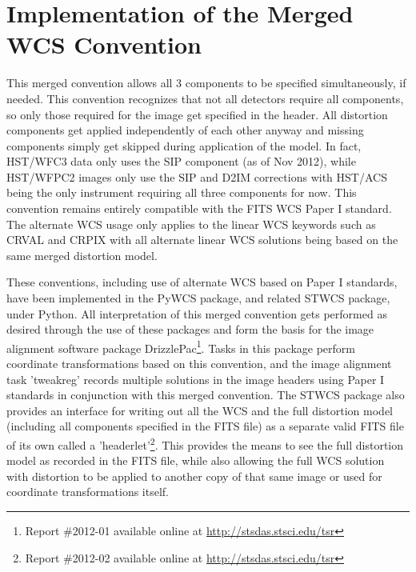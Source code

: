 \section{Implementation of the Merged WCS Convention}
This merged convention allows all 3 components to be specified simultaneously, if needed.  This convention recognizes that not all detectors require all components, so only those required for the image get specified in the header. All distortion components get applied independently of each other anyway and missing components simply get skipped during application of the model. In fact, HST/WFC3 data only uses the SIP component (as of Nov 2012), while HST/WFPC2 images only use the SIP and D2IM corrections with HST/ACS being the only instrument requiring all three components for now. This convention remains entirely compatible with the FITS WCS Paper I standard\citep{greisen_2002}. The alternate WCS usage only applies to the linear WCS keywords such as CRVAL and CRPIX with all alternate linear WCS solutions being based on the same merged distortion model.

These conventions, including use of alternate WCS based on Paper I standards, have been implemented in the PyWCS package, and related STWCS package, under Python. All interpretation of this merged convention gets performed as desired through the use of these packages and form the basis for the image alignment software package DrizzlePac\citep{hack_fc}\footnote{Report \#2012-01 available online at \url{http://stsdas.stsci.edu/tsr}}. Tasks in this package perform coordinate transformations based on this convention, and the image alignment task 'tweakreg' records multiple solutions in the image headers using Paper I standards in conjunction with this merged convention. The STWCS package also provides an interface for writing out all the WCS and the full distortion model (including all components specified in the FITS file) as a separate valid FITS file of its own called a 'headerlet'\citep{hack_hlet}\footnote{Report \#2012-02 available online at \url{http://stsdas.stsci.edu/tsr}}.  This provides the means to see the full distortion model as recorded in the FITS file, while also allowing the full WCS solution with distortion to be applied to another copy of that same image or used for coordinate transformations itself.

